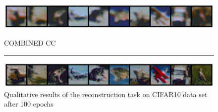 \begin{figure}[h]
    \centerline{\hspace*{8mm}\includegraphics[width=1.4\textwidth]{figures/reconstruction_CIFAR10_RP_ReLU_CC_epoch_100.png}}
    \caption*{\normalsize{COMBINED CC}}
    \rule{0.4\textwidth}{.4pt}
    
    \centerline{\hspace*{8mm}\includegraphics[width=1.4\textwidth]{figures/reconstruction_CIFAR10_COMBINED_CC_epoch_100.png}}
    
    \caption{Qualitative results of the reconstruction task on CIFAR10 data set after 100 epochs}
    \label{fig:CIFAR_Images}
\end{figure}



